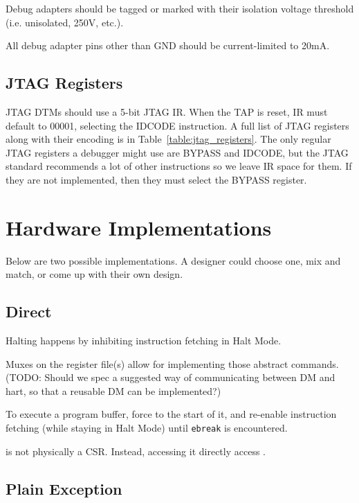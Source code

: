 \documentclass{article}
\begin{document}
Debug adapters should be tagged or marked with their isolation voltage
threshold (i.e. unisolated, 250V, etc.).

All debug adapter pins other than GND should be current-limited to 20mA.

\subsection{JTAG Registers}

JTAG DTMs should use a 5-bit JTAG IR. When the TAP is reset, IR must default to
00001, selecting the IDCODE instruction. A full list of JTAG registers along
with their encoding is in Table~\ref{table:jtag_registers}. The only regular
JTAG registers a debugger might use are BYPASS and IDCODE, but the JTAG
standard recommends a lot of other instructions so we leave IR space for them.
If they are not implemented, then they must select the BYPASS register.



\newpage
\appendix

\section{Hardware Implementations}

Below are two possible implementations. A designer could choose one, mix and
match, or come up with their own design.

\subsection{Direct}

Halting happens by inhibiting instruction fetching in Halt Mode.

Muxes on the register file(s) allow for implementing those abstract commands.
(TODO: Should we spec a suggested way of communicating between DM and hart, so
that a reusable DM can be implemented?)

To execute a program buffer, force \Rpc to the start of it, and re-enable
instruction fetching (while staying in Halt Mode) until {\tt ebreak} is
encountered.

\Rdpc is not physically a CSR. Instead, accessing it directly access \Rpc.

\subsection{Plain Exception}
\end{document}
